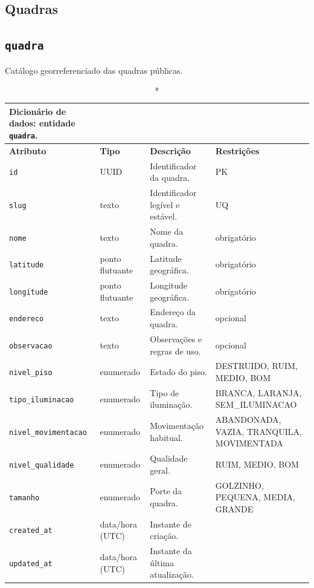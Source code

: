\begin{apendicesenv}
    \section*{Quadras}

    \subsection*{\texttt{quadra}}
    Catálogo georreferenciado das quadras públicas.
    \begin{longtable}{p{2.5cm}p{2.1cm}p{5.8cm}p{2.9cm}}
    \caption*{Dicionário de dados: entidade \texttt{quadra}.}\\
        \hline
        \textbf{Atributo} & \textbf{Tipo} & \textbf{Descrição} & \textbf{Restrições} \\
        \hline
        \endhead
        \texttt{id} & UUID & Identificador da quadra. & PK \\
        \texttt{slug} & texto & Identificador legível e estável. & UQ \\
        \texttt{nome} & texto & Nome da quadra. & obrigatório \\
        \texttt{latitude} & ponto flutuante & Latitude geográfica. & obrigatório \\
        \texttt{longitude} & ponto flutuante & Longitude geográfica. & obrigatório \\
        \texttt{endereco} & texto & Endereço da quadra. & opcional \\
        \texttt{observacao} & texto & Observações e regras de uso. & opcional \\
        \texttt{nivel\_piso} & enumerado & Estado do piso. & DESTRUIDO, RUIM, MEDIO, BOM \\
        \texttt{tipo\_iluminacao} & enumerado & Tipo de iluminação. & BRANCA, LARANJA, SEM\_ILUMINACAO \\
        \texttt{nivel\_movimentacao} & enumerado & Movimentação habitual. & ABANDONADA, VAZIA, TRANQUILA, MOVIMENTADA \\
        \texttt{nivel\_qualidade} & enumerado & Qualidade geral. & RUIM, MEDIO, BOM \\
        \texttt{tamanho} & enumerado & Porte da quadra. & GOLZINHO, PEQUENA, MEDIA, GRANDE \\
        \texttt{created\_at} & data/hora (UTC) & Instante de criação. & \\
        \texttt{updated\_at} & data/hora (UTC) & Instante da última atualização. & \\
        \hline
    \end{longtable}


\end{apendicesenv}
